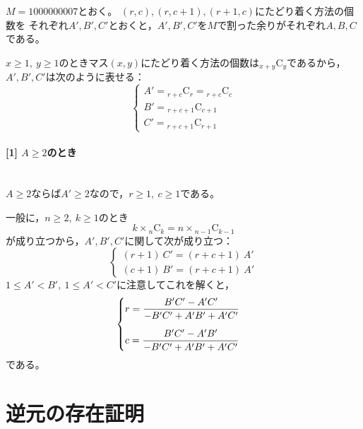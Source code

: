\documentclass{article}
\newcommand{\myparagraph}[1]{\paragraph{#1}\mbox{}\\}
\newcommand{\combination}[2]{{}_{#1} \mathrm{C}_{#2}}
\begin{document}
$M = 1000000007$とおく。
$(r, c), (r, c + 1), (r + 1, c)$にたどり着く方法の個数を
それぞれ$A', B', C'$とおくと，$A', B', C'$を$M$で割った余りがそれぞれ$A, B, C$である。

$x \geq 1,\ y \geq 1$のときマス$(x, y)$にたどり着く方法の個数は$\combination{x + y}{y}$であるから，
$A', B', C'$は次のように表せる：
\begin{equation*}
    \begin{cases}
        A' = \combination{r + c}{r} = \combination{r + c}{c} \\
        B' = \combination{r + c + 1}{c + 1} \\
        C' = \combination{r + c + 1}{r + 1}
    \end{cases}
\end{equation*}

\myparagraph{[1] $A \geq 2$のとき}

$A \geq 2$ならば$A' \geq 2$なので，$r \geq 1,\ c \geq 1$である。

一般に，$n \geq 2,\ k \geq 1$のとき
\begin{equation*}
    k \times \combination{n}{k} = n \times \combination{n - 1}{k - 1}
\end{equation*}
が成り立つから，$A', B', C'$に関して次が成り立つ：
\begin{equation*}
    \begin{cases}
        (r + 1)\ C' = (r + c + 1)\ A' \\
        (c + 1)\ B' = (r + c + 1)\ A'
    \end{cases}
\end{equation*}
$1 \leq A' < B',\ 1 \leq A' < C'$に注意してこれを解くと，
\begin{equation*}
    \begin{cases}
        \vspace{10pt}
        r = \dfrac{B'C' - A'C'}{-B'C' + A'B' + A'C'} \\
        c = \dfrac{B'C' - A'B'}{-B'C' + A'B' + A'C'}
    \end{cases}
\end{equation*}
である。




\section{逆元の存在証明}

\end{document}
